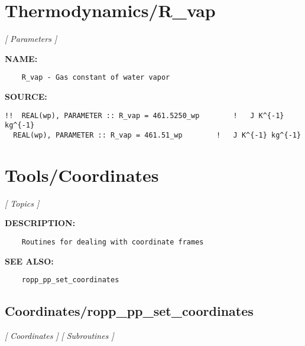 \section{Thermodynamics/R\_vap}
\textsl{[ Parameters ]}

\label{ch:robo101}
\label{ch:Thermodynamics_R_vap}
\textbf{NAME:}\hspace{0.08in}\begin{Verbatim}
    R_vap - Gas constant of water vapor
\end{Verbatim}
\textbf{SOURCE:}\hspace{0.08in}\begin{Verbatim}
!!  REAL(wp), PARAMETER :: R_vap = 461.5250_wp        !   J K^{-1} kg^{-1}
  REAL(wp), PARAMETER :: R_vap = 461.51_wp        !   J K^{-1} kg^{-1}
\end{Verbatim}
\section{Tools/Coordinates}
\textsl{[ Topics ]}

\label{ch:robo102}
\label{ch:Tools_Coordinates}
\textbf{DESCRIPTION:}\hspace{0.08in}\begin{Verbatim}
    Routines for dealing with coordinate frames
\end{Verbatim}
\textbf{SEE ALSO:}\hspace{0.08in}\begin{Verbatim}
    ropp_pp_set_coordinates
\end{Verbatim}
\subsection{Coordinates/ropp\_pp\_set\_coordinates}
\textsl{[ Coordinates ]}
\textsl{[ Subroutines ]}

